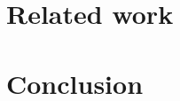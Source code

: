\documentclass[sigconf]{acmart}
\begin{document}
\section{Related work} \label{sec:relatedWork}

\section{Conclusion} \label{sec:conclusion}





\end{document}
